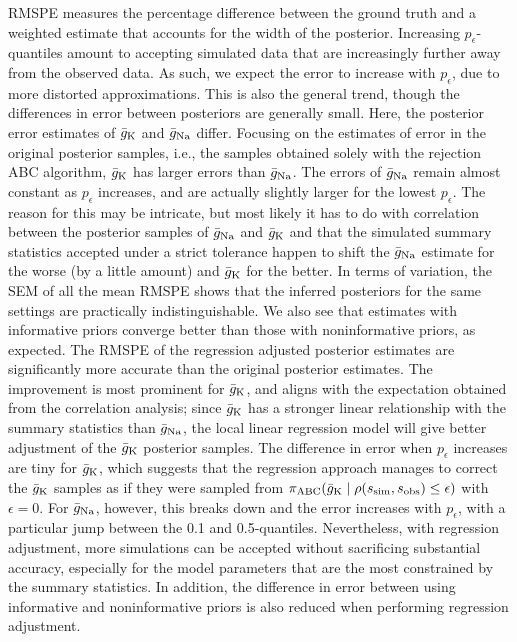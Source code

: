 RMSPE measures the percentage difference between the ground truth and a weighted estimate that accounts for the width of the posterior. Increasing $p_\epsilon$-quantiles amount to accepting simulated data that are increasingly further away from the observed data. As such, we expect the error to increase with $p_\epsilon$, due to more distorted approximations. This is also the general trend, though the differences in error between posteriors are generally small. Here, the posterior error estimates of $\bar{g}_{\mathrm{K}}$ and $\bar{g}_{\mathrm{Na}}$ differ. Focusing on the estimates of error in the original posterior samples, i.e., the samples obtained solely with the rejection ABC algorithm, $\bar{g}_{\mathrm{K}}$ has larger errors than $\bar{g}_{\mathrm{Na}}$. The errors of $\bar{g}_{\mathrm{Na}}$ remain almost constant as $p_\epsilon$ increases, and are actually slightly larger for the lowest $p_\epsilon$. The reason for this may be intricate, but most likely it has to do with correlation between the posterior samples of $\bar{g}_{\mathrm{Na}}$ and $\bar{g}_{\mathrm{K}}$ and that the simulated summary statistics accepted under a strict tolerance happen to shift the $\bar{g}_{\mathrm{Na}}$ estimate for the worse (by a little amount) and $\bar{g}_{\mathrm{K}}$ for the better. In terms of variation, the SEM of all the mean RMSPE shows that the inferred posteriors for the same settings are practically indistinguishable. We also see that estimates with informative priors converge better than those with noninformative priors, as expected. The RMSPE of the regression adjusted posterior estimates are significantly more accurate than the original posterior estimates. The improvement is most prominent for $\bar{g}_{\mathrm{K}}$, and aligns with the expectation obtained from the correlation analysis; since $\bar{g}_{\mathrm{K}}$ has a stronger linear relationship with the summary statistics than $\bar{g}_{\mathrm{Na}}$, the local linear regression model will give better adjustment of the $\bar{g}_{\mathrm{K}}$ posterior samples. The difference in error when $p_\epsilon$ increases are tiny for $\bar{g}_{\mathrm{K}}$, which suggests that the regression approach manages to correct the $\bar{g}_{\mathrm{K}}$ samples as if they were sampled from $\pi_\mathrm{ABC} \qty(\bar{g}_{\mathrm{K}} \mid \rho \qty(s_\mathrm{sim}, s_\mathrm{obs}) \leq \epsilon)$ with $\epsilon=0$. For $\bar{g}_{\mathrm{Na}}$, however, this breaks down and the error increases with $p_\epsilon$, with a particular jump between the 0.1 and 0.5-quantiles. Nevertheless, with regression adjustment, more simulations can be accepted without sacrificing substantial accuracy, especially for the model parameters that are the most constrained by the summary statistics. In addition, the difference in error between using informative and noninformative priors is also reduced when performing regression adjustment. 

